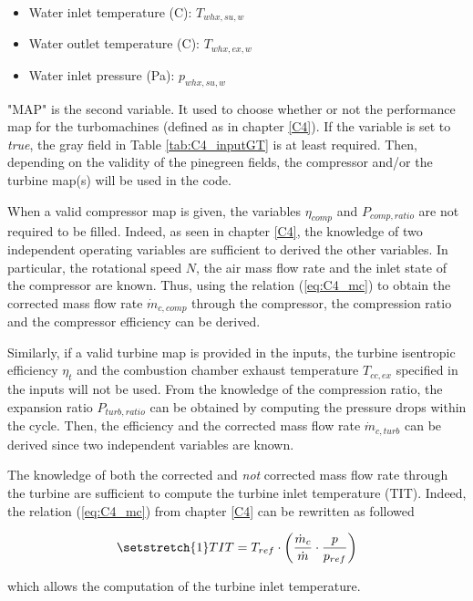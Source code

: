 \begin{itemize}
\item Water inlet temperature (\degree C): $T_{whx,su,w}$
\item Water outlet temperature (\degree C): $T_{whx,ex,w}$
\item Water inlet pressure (Pa): $p_{whx,su,w}$
\end{itemize}

"MAP" is the second variable. It used to choose whether or not the performance map for the turbomachines (defined as in chapter \ref{C4}). If the variable is set to \textit{true}, the {\color{Gray} gray} field in Table \ref{tab:C4_inputGT} is at least required. Then, depending on the validity of the {\color{PineGreen} pinegreen} fields, the compressor and/or the turbine map(s) will be used in the code. 

When a valid compressor map is given, the variables $\eta_{comp}$ and $P_{comp,ratio}$ are not required to be filled. Indeed, as seen in chapter \ref{C4}, the knowledge of two independent operating variables are sufficient to derived the other variables. In particular, the rotational speed $N$, the air mass flow rate and the inlet state of the compressor are known. Thus, using the relation (\ref{eq:C4_mc}) to obtain the corrected mass flow rate $\dot{m}_{c,comp}$ through the compressor, the compression ratio and the compressor efficiency can be derived.  

Similarly, if a valid turbine map is provided in the inputs, the turbine isentropic efficiency $\eta_{t}$ and the combustion chamber exhaust temperature $T_{cc,ex}$ specified in the inputs will not be used. From the knowledge of the compression ratio, the expansion ratio $P_{turb,ratio}$ can be obtained by computing the pressure drops within the cycle. Then, the efficiency and the corrected mass flow rate $\dot{m}_{c,turb}$ can be derived since two independent variables are known.

The knowledge of both the corrected and \textit{not} corrected mass flow rate through the turbine are sufficient to compute the turbine inlet temperature (TIT). Indeed, the relation (\ref{eq:C4_mc}) from chapter \ref{C4} can be rewritten as followed

\begin{equation}
    \setstretch{1}
TIT =T_{ref}\cdot \left(\frac{\dot{m}_c}{\dot{m}}\cdot\frac{p}{p_{ref}}\right)
\end{equation} 

which allows the computation of the turbine inlet temperature.
\newpage
